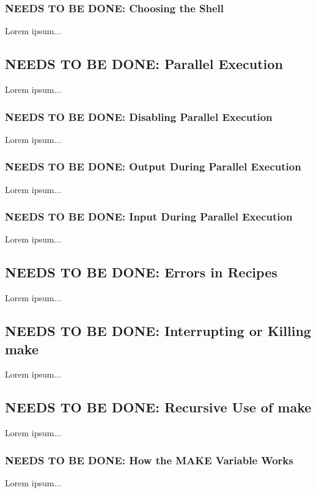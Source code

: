 \documentclass{charun}
\begin{document}
\begin{multicols*}{2}
\color{gray}
\subsubsection{NEEDS TO BE DONE: Choosing the Shell}
Lorem ipsum...
\color{black}

\color{gray}
\subsection{NEEDS TO BE DONE: Parallel Execution}
Lorem ipsum...
\color{black}

\color{gray}
\subsubsection{NEEDS TO BE DONE: Disabling Parallel Execution}
Lorem ipsum...
\color{black}

\color{gray}
\subsubsection{NEEDS TO BE DONE: Output During Parallel Execution}
Lorem ipsum...
\color{black}

\color{gray}
\subsubsection{NEEDS TO BE DONE: Input During Parallel Execution}
Lorem ipsum...
\color{black}

\color{gray}
\subsection{NEEDS TO BE DONE: Errors in Recipes}
Lorem ipsum...
\color{black}

\color{gray}
\subsection{NEEDS TO BE DONE: Interrupting or Killing make}
Lorem ipsum...
\color{black}

\color{gray}
\subsection{NEEDS TO BE DONE: Recursive Use of make}
Lorem ipsum...
\color{black}

\color{gray}
\subsubsection{NEEDS TO BE DONE: How the MAKE Variable Works}
Lorem ipsum...
\color{black}


\end{multicols*}
\end{document}

